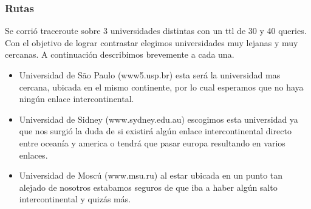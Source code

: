 \subsubsection*{Rutas}
Se corrió traceroute sobre 3 universidades distintas con un ttl de 30 y 40 queries. Con el objetivo de lograr contrastar elegimos universidades muy lejanas y muy cercanas. A continuación describimos brevemente a cada una.

\begin{itemize}
	\item Universidad de São Paulo (www5.usp.br) esta será la universidad mas cercana, ubicada en el mismo continente, por lo cual esperamos que no haya ningún enlace intercontinental.
	\item Universidad de Sidney (www.sydney.edu.au) escogimos esta universidad ya que nos surgió la duda de si existirá algún enlace intercontinental directo entre oceanía y america o tendrá que pasar europa resultando en varios enlaces.
	\item Universidad de Moscú (www.msu.ru) al estar ubicada en un punto tan alejado de nosotros estabamos seguros de que iba a haber algún salto intercontinental y quizás más.
\end{itemize}